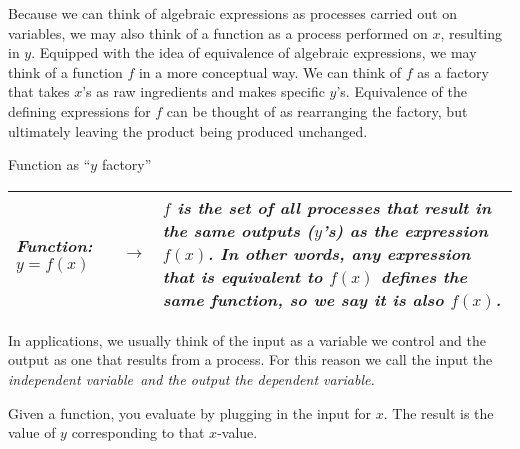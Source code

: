 \par

Because we can think of algebraic expressions as processes carried out on  variables, we may also think of a function as a process performed on $x$, resulting in $y$. Equipped with the idea of equivalence of algebraic expressions, we may think of a function $f$ in a more conceptual way. We can think of $f$ as a factory that takes $x$'s as raw ingredients and makes specific $y$'s. Equivalence of the defining expressions for $f$ can be thought of as rearranging the factory, but ultimately leaving the product being produced unchanged.

\begin{center}
Function as ``$y$ factory'' 
\begin{tabular}{|p{1.5in} c p{2in} |}
\hline\hline \it{Function: $y = f(x)$} & $\longrightarrow$ & \it{$f$ is the set of all processes that result in the same outputs ($y$'s) as the expression $f(x)$. In other words, any expression that is equivalent to $f(x)$ defines the same function, so we say it is also $f(x)$. }\normalfont\\
\hline
\end{tabular}
\end{center} 

In applications, we usually think of the input as a variable we control and the output as one that results from a process. For this reason we call the input the \it{independent variable}\ \normalfont and the output the \it{dependent variable}.
\normalfont

\par

Given a function, you evaluate by plugging in the input for $x$. The result is the value of $y$ corresponding to that $x$-value. 

\par 

